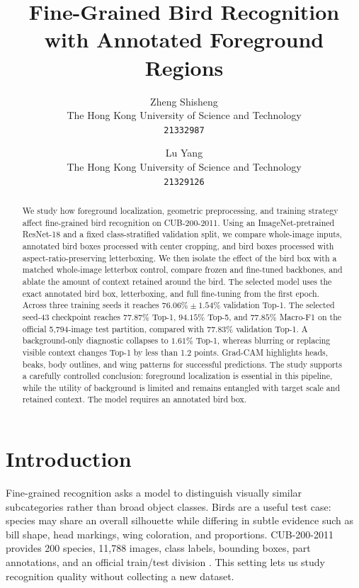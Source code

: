 \documentclass[10pt,twocolumn,letterpaper]{article}
\begin{document}
\title{Fine-Grained Bird Recognition with Annotated Foreground Regions}

\author{Zheng Shisheng\\
The Hong Kong University of Science and Technology\\
{\tt\small 21332987}
\and
Lu Yang\\
The Hong Kong University of Science and Technology\\
{\tt\small 21329126}
}

\maketitle

\begin{abstract}
We study how foreground localization, geometric preprocessing, and training
strategy affect fine-grained bird recognition on CUB-200-2011. Using an
ImageNet-pretrained ResNet-18 and a fixed class-stratified validation split,
we compare whole-image inputs, annotated bird boxes processed with center
cropping, and bird boxes processed with aspect-ratio-preserving letterboxing.
We then isolate the effect of the bird box with a matched whole-image
letterbox control, compare frozen and fine-tuned backbones, and ablate the
amount of context retained around the bird. The selected model uses the exact
annotated bird box, letterboxing, and full fine-tuning from the first epoch.
Across three training seeds it reaches $76.06\%\pm1.54\%$ validation Top-1.
The selected seed-43 checkpoint reaches $77.87\%$ Top-1, $94.15\%$ Top-5, and
$77.85\%$ Macro-F1 on the official 5,794-image test partition, compared with
$77.83\%$ validation Top-1. A background-only diagnostic collapses to
$1.61\%$ Top-1, whereas blurring or replacing visible context changes Top-1
by less than 1.2 points. Grad-CAM highlights heads, beaks, body outlines, and
wing patterns for successful predictions. The study supports a carefully
controlled conclusion: foreground localization is essential in this pipeline,
while the utility of background is limited and remains entangled with target
scale and retained context. The model requires an annotated bird box.
\end{abstract}

\section{Introduction}

Fine-grained recognition asks a model to distinguish visually similar
subcategories rather than broad object classes. Birds are a useful test case:
species may share an overall silhouette while differing in subtle evidence
such as bill shape, head markings, wing coloration, and proportions.
CUB-200-2011 provides 200 species, 11,788 images, class labels, bounding
boxes, part annotations, and an official train/test division
\cite{wah2011cub}. This setting lets us study recognition quality without
collecting a new dataset.
\end{document}
